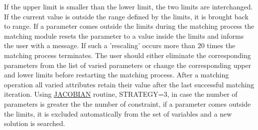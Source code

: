 If the upper limit is smaller than the lower limit, the two limits are interchanged. If the current value is outside the range defined by the limits, it is brought back to range. If a parameter comes outside the limits during the matching process the matching module resets the parameter to a value inside the limits and informs the user with a message. If such a 'rescaling' occurs more than 20 times the matching process terminates. The user should either eliminate the corresponding parameters from the list of varied parameters or change the corresponding upper and lower limits before restarting the matching process. After a matching operation all varied attributes retain their value after the last successful matching iteration. Using \href{match_xeq.html#jacobian}{JACOBIAN} routine, STRATEGY=3, in case the number of parameters is greater the the number of constraint, if a parameter comes outside the limits, it is excluded automatically from the set of variables and a new solution is searched. 

